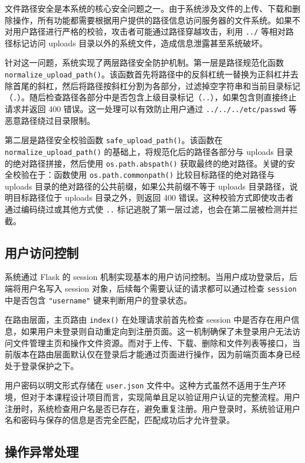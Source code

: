 \documentclass[UTF8,zihao=-4]{ctexrep}
\begin{document}
文件路径安全是本系统的核心安全问题之一。由于系统涉及文件的上传、下载和删除操作，所有功能都需要根据用户提供的路径信息访问服务器的文件系统。如果不对用户路径进行严格的校验，攻击者可能通过路径穿越攻击，利用 \texttt{../} 等相对路径标记访问 uploads 目录以外的系统文件，造成信息泄露甚至系统破坏。

针对这一问题，系统实现了两层路径安全防护机制。第一层是路径规范化函数 \texttt{normalize\_upload\_path()}。该函数首先将路径中的反斜杠统一替换为正斜杠并去除首尾的斜杠，然后将路径按斜杠分割为各部分，过滤掉空字符串和当前目录标记（\texttt{.}）。随后检查路径各部分中是否包含上级目录标记（\texttt{..}），如果包含则直接终止请求并返回 400 错误。这一处理可以有效防止用户通过 \texttt{../../../etc/passwd} 等恶意路径绕过目录限制。

第二层是路径安全校验函数 \texttt{safe\_upload\_path()}。该函数在 \texttt{normalize\_upload\_path()} 的基础上，将规范化后的路径各部分与 uploads 目录的绝对路径拼接，然后使用 \texttt{os.path.abspath()} 获取最终的绝对路径。关键的安全校验在于：函数使用 \texttt{os.path.commonpath()} 比较目标路径的绝对路径与 uploads 目录的绝对路径的公共前缀，如果公共前缀不等于 uploads 目录路径，说明目标路径位于 uploads 目录之外，则返回 400 错误。这种校验方式即使攻击者通过编码绕过或其他方式使 \texttt{..} 标记逃脱了第一层过滤，也会在第二层被检测并拦截。

\subsection{用户访问控制}

系统通过 Flask 的 session 机制实现基本的用户访问控制。当用户成功登录后，后端将用户名写入 session 对象，后续每个需要认证的请求都可以通过检查 \texttt{session} 中是否包含 \texttt{"username"} 键来判断用户的登录状态。

在路由层面，主页路由 \texttt{index()} 在处理请求前首先检查 session 中是否存在用户信息，如果用户未登录则自动重定向到注册页面。这一机制确保了未登录用户无法访问文件管理主页和操作文件资源。而对于上传、下载、删除和文件列表等接口，当前版本在路由层面默认仅在登录后才能通过页面进行操作，因为前端页面本身已经处于登录保护之下。

用户密码以明文形式存储在 \texttt{user.json} 文件中。这种方式虽然不适用于生产环境，但对于本课程设计项目而言，实现简单且足以验证用户认证的完整流程。用户注册时，系统检查用户名是否已存在，避免重复注册。用户登录时，系统验证用户名和密码与保存的信息是否完全匹配，匹配成功后才允许登录。

\subsection{操作异常处理}
\end{document}

